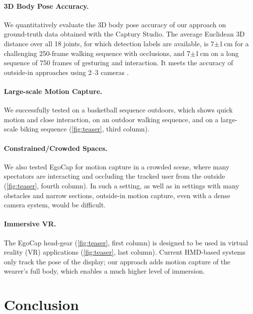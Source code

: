 \documentclass[runningheads]{llncs}
\newcommand{\NEW}[1]{#1}
\begin{document}
\paragraph{\textbf{3D Body Pose Accuracy.}}
\label{sec:comparisons}

We quantitatively evaluate the 3D body pose accuracy of our approach on ground-truth data obtained with the Captury Studio.
The average Euclidean 3D distance over all 18 joints, for which detection labels are available, is 7$\pm$1\,cm for a challenging 250-frame walking sequence with occlusions, and \NEW{7$\pm$1\,cm} on a long sequence of \NEW{750} frames of gesturing and interaction.
It meets the accuracy of outside-in approaches using 2--3 cameras \cite{ElhayAJTPABST2015}.


\paragraph{\textbf{Large-scale Motion Capture.}}
We successfully tested on a basketball sequence outdoors, which shows quick motion and close interaction, 
on an outdoor walking sequence, and on a large-scale biking sequence (\cref{fig:teaser}, third column).


\paragraph{\textbf{Constrained/Crowded Spaces.}}
We also tested EgoCap for motion capture in a crowded scene, where many spectators are interacting and occluding the tracked user from the outside (\cref{fig:teaser}, fourth column).
In such a setting, as well as in settings with many obstacles and narrow sections, outside-in motion capture, even with a dense camera system, would be difficult.


\paragraph{\textbf{Immersive VR.}}\label{sec:VR}
The EgoCap head-gear (\cref{fig:teaser}, first column) is designed to be used in virtual reality (VR) applications (\cref{fig:teaser}, last column). 
Current HMD-based systems only track the pose of the display; our approach adds motion capture of the wearer's full body, which enables a much higher level of immersion.


\section{Conclusion}
\end{document}
